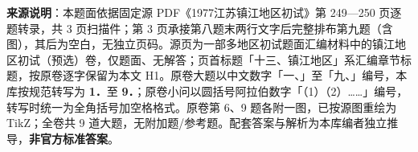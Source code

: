 


\begin{gktip}
\textbf{来源说明}：本题面依据固定源 PDF《1977江苏镇江地区初试》第 249—250 页逐题转录，共 3 页扫描件；第 3 页承接第八题末两行文字后完整排布第九题（含图），其后为空白，无独立页码。源页为一部多地区初试题面汇编材料中的镇江地区初试（预选）卷，仅题面、无解答；页首标题「十三、镇江地区」系汇编章节标题，按原卷逐字保留为本文 H1。原卷大题以中文数字「一、」至「九、」编号，本库按规范转写为 \textbf{1．}至 \textbf{9．}；原卷小问以圆括号阿拉伯数字「（1）（2）……」编号，转写时统一为全角括号加空格格式。原卷第 6、9 题各附一图，已按源图重绘为 TikZ；全卷共 9 道大题，无附加题/参考题。配套答案与解析为本库编者独立推导，\textbf{非官方标准答案}。
\end{gktip}

\par\medskip

